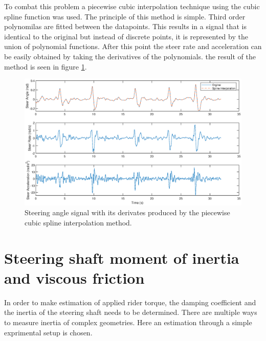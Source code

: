 To combat this problem a piecewise cubic interpolation technique using the cubic spline function was used. The principle of this method is simple. Third order polynomilas are fitted   between the datapoints. This results in a signal that is identical to the original but instead of discrete points, it is represented by the union of polynomial functions. After this point the steer rate and acceleration can be easily obtained by taking the derivatives of the polynomials. the result of the method is seen in figure \ref{fig:spline}. 
\begin{figure}[ht]
    \centering
    \captionsetup{justification=centering,margin=2cm}

    \includegraphics[width=\linewidth]{images/steer_rates_spline.eps}
    \caption{Steering angle signal with its derivates produced by the piecewise cubic spline interpolation method.}
    \label{fig:spline}
\end{figure}
\section{Steering shaft moment of inertia and viscous friction}

In order to make estimation of applied rider torque, the damping coefficient and the inertia of the steering shaft needs to be determined. There are multiple ways to measure inertia of complex geometries. Here an estimation through a simple exprimental setup is chosen.

